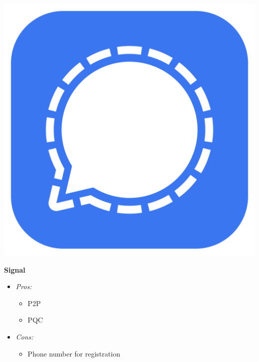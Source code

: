 \documentclass{beamer}
\begin{document}
\begin{frame}
\begin{columns}[T,onlytextwidth]
    \begin{column}{0.5\textwidth}
        \begin{minipage}[c]{.15\textwidth}
            \includegraphics[width=\textwidth]{resources/signal.png}
        \end{minipage}%
        \begin{minipage}[c]{.85\textwidth}
            \textbf{  Signal}
        \end{minipage}
        
        \begin{itemize}
            \item[] \textit{Pros:}
            \begin{itemize}
                \item P2P
                \item PQC 
            \end{itemize}
            \item[] \textit{Cons:}
            \begin{itemize}
                \item Phone number for registration
            \end{itemize}
        \end{itemize}
    \end{column}
   
    \end{columns}
\end{frame}
\end{document}

